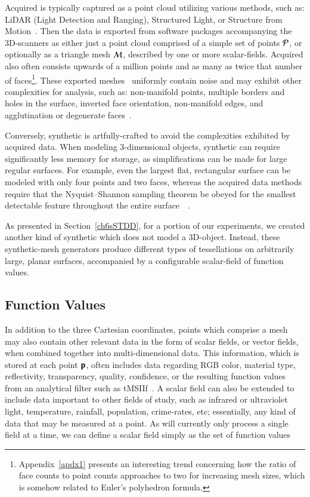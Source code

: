 Acquired \tdd{} is typically captured as a point cloud utilizing various methods, such as: LiDAR (Light Detection and Ranging), Structured Light, or Structure from Motion~\cite[p.~19]{Mara12}. Then the data is exported from software packages accompanying the 3D-scanners as either just a point cloud comprised of a simple set of points $\mathcal{P}$, or optionally as a triangle mesh $\mathcal{M}$, described by one or more scalar-fields. Acquired \tdd{} also often consists upwards of a million points and as many as twice that number of faces\footnote{Appendix~\ref{apdx1} presents an interesting trend concerning how the ratio of face counts to point counts approaches to two for increasing mesh sizes, which is somehow related to Euler's polyhedron formula.}. These exported meshes~\cite[p.~25]{Mara12} uniformly contain noise and may exhibit other complexities for analysis, such as: non-manifold points, multiple borders and holes in the surface, inverted face orientation, non-manifold edges, and agglutination or degenerate faces~\cite[p.~28-32]{Mara12}.

Conversely, synthetic \tdd{} is artfully-crafted to avoid the complexities exhibited by acquired data. When modeling 3-dimensional objects, synthetic \tdd{} can require significantly less memory for storage, as simplifications can be made for large regular surfaces. For example, even the largest flat, rectangular surface can be modeled with only four points and two faces, whereas the acquired data methods require that the Nyquist–Shannon sampling theorem be obeyed for the smallest detectable feature throughout the entire surface~\cite[p.~19]{Mara12}~\cite[p.~3]{Mara17}.

As presented in Section~\ref{ch6sSTDD}, for a portion of our experiments, we created another kind of synthetic \tdd{} which does not model a 3D-object. Instead, these synthetic-mesh generators produce different types of tessellations on arbitrarily large, planar surfaces, accompanied by a configurable scalar-field of function values.

%
%
%
\subsection{Function Values}
\label{ch2sTDDssFV}
In addition to the three Cartesian coordinates, points which comprise a mesh may also contain other relevant data in the form of scalar fields, or vector fields, when combined together into multi-dimensional data. This information, which is stored at each point $\mathbf{p}$, often includes data regarding RGB color, material type, reflectivity, transparency, quality, confidence, or the resulting function values from an analytical filter such as \gls{tMSIIf}~\cite[p.~21]{Mara12}. A scalar field  can also be extended to include data important to other fields of study, such as infrared or ultraviolet light, temperature, rainfall, population, crime-rates, etc; essentially, any kind of data that may be measured at a point. As  will currently only process a single field at a time, we can define a scalar field simply as the set of function values

